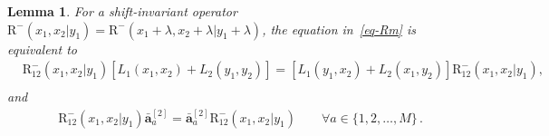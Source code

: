 \documentclass[11pt]{article}
\numberwithin{equation}{section}
\newtheorem{lemma}[theorem]{Lemma}
\newcommand{\oad}{\mathbf{\bar{a}}}
\newcommand{\M}{M}
\newcommand{\abrOSCR}{\mathrm{R}}
\begin{document}
\begin{lemma}\label{Lemma-equivalence}
	For a shift-invariant operator $\abrOSCR^{-}(x_1,x_2|y_1)=\abrOSCR^{-}(x_1+\lambda,x_2+\lambda|y_1+\lambda)$, the equation in~\eqref{eq-Rm} is equivalent to
	\begin{equation}\label{goal-2a}
		\begin{split}
			&\abrOSCR_{12}^{-}(x_1,x_2|y_1)\left[L_{1}(x_{1},x_{2})+L_{2}(y_{1},y_{2})\right]=\left[L_{1}(y_{1},x_{2})+L_{2}(x_{1},y_{2})\right]\abrOSCR_{12}^{-}(x_1,x_2|y_1),\\
			\end{split}
	\end{equation}
	and
	\begin{equation}\label{goal-2b}
		\begin{split}
			&\abrOSCR_{12}^{-}(x_1,x_2|y_1)\oad_{a}^{[2]}=\oad^{[2]}_a\abrOSCR_{12}^{-}(x_1,x_2|y_1)\qquad \forall a\in \{1,2,\ldots,\M\}\,.
		\end{split}
	\end{equation}
\end{lemma}
\end{document}
